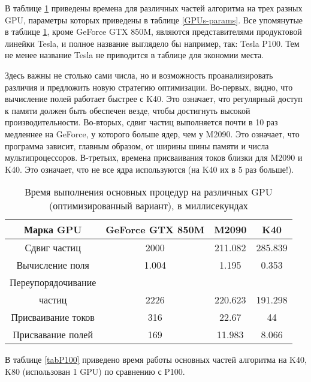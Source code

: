 В таблице \ref {PerfGPUs} приведены времена для различных частей алгоритма на трех разных GPU, параметры которых приведены в таблице \ref{GPUs-params}. Все упомянутые в таблице \ref {PerfGPUs}, кроме GeForce GTX 850M, являются представителями продуктовой линейки Tesla, и полное название выглядело бы например, так: Tesla P100. Тем не менее название Tesla не приводится в таблице для экономии места.

  Здесь важны не столько сами числа, но и возможность проанализировать различия и предложить новую стратегию оптимизации. Во-первых, видно, что вычисление полей работает быстрее с K40. Это означает, что регулярный доступ к памяти должен быть обеспечен везде, чтобы достигнуть высокой производительности. Во-вторых, сдвиг частиц выполняется почти в 10 раз медленнее на  GeForce, у которого больше ядер, чем у M2090. Это означает, что программа зависит, главным образом, от ширины шины памяти
и числа мультипроцессоров. В-третьих, времена присваивания токов  близки для M2090 и K40. Это означает, что не все ядра используются (на K40 их в 5 раз больше!).

\begin{table}[ht]
	\begin{center}
		\caption{Время выполнения основных процедур на различных GPU (оптимизированный вариант), в миллисекундах}
		\begin{tabular}{|c|c|c|c|}
			\hline
			Марка GPU        &  GeForce GTX 850M & M2090 & K40 \\ \hline
			Сдвиг частиц       &  2000           &  211.082    & 285.839 \\ \hline
			Вычисление поля    &  1.004          &  1.195      & 0.353   \\ \hline
			Переупорядочивание  &                 &             &         \\
			частиц            &  2226           &  220.623    & 191.298  \\ \hline
			Присваивание токов &  316            &  22.67      & 44 \\ \hline
			Присвавание полей   &  169            &  11.983     & 8.066 \\ \hline
		\end{tabular}
		\label{PerfGPUs}
	\end{center}
\end{table}



В таблице \ref{tabP100} приведено время работы основных частей алгоритма на K40, K80 (использован 1 GPU) по сравнению с P100.

